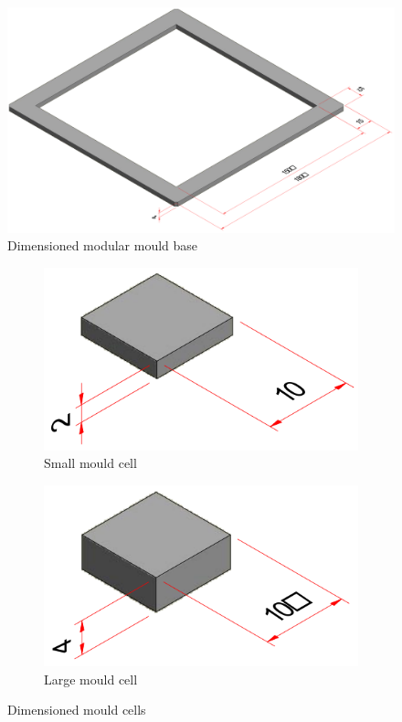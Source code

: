 \begin{figure}[H]
	\centering
	\includegraphics[width=\textwidth]{MB.png}
	\caption{Dimensioned modular mould base}
	\label{fig:mb}
\end{figure}

\begin{figure}[H]
	\centering
	\begin{subfigure}[c]{0.3\textwidth}
		\centering
		\includegraphics[width=\textwidth]{MCS.png}
		\caption{Small mould cell}
	\end{subfigure}
	\hfill
	\begin{subfigure}[c]{0.3\textwidth}
		\centering
		\includegraphics[width=\textwidth]{MCL.png}
		\caption{Large mould cell}
	\end{subfigure}
	\caption{Dimensioned mould cells}
	\label{fig:mc}
\end{figure}

